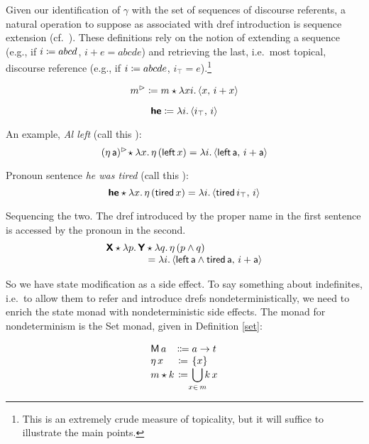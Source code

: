 	Given our identification of $\gamma$ with the set of sequences of discourse referents, a natural operation to suppose as associated with dref introduction is sequence extension (cf.~\citealt{Groote:2006, Unger:2012, Charlow:diss}). These definitions rely on the notion of extending a sequence (e.g., if $i \coloneqq abcd$, $i+e = abcde$) and retrieving the last, i.e.~most topical, discourse reference (e.g., if $i \coloneqq abcde$, $i_\top = e$).\footnote{This is an extremely crude measure of topicality, but it will suffice to illustrate the main points.}%
	\begin{defi}
		\[m^\rhd \coloneqq m \star \lambda xi.\,\langle x,\,i + x \rangle\]
	\end{defi}
	\begin{defi}
		\[\textbf{\textsf{he}} \coloneqq \lambda i.\,\langle i_\top,\,i \rangle\]
	\end{defi}
	
	An example, \emph{Al left} (call this ):
	\[(\eta\,\textsf{a})^\rhd\! \star \lambda x.\,\eta\,(\textsf{left}\,x) = \lambda i.\,\langle \textsf{left}\,\textsf{a},\,i+\textsf{a} \rangle\]%
	
	Pronoun sentence \emph{he was tired} (call this ):
	\[\textbf{\textsf{he}} \star \lambda x.\,\eta\,(\textsf{tired}\,x) = \lambda i.\,\langle \textsf{tired}\,i_\top,\,i \rangle\]%
	
	Sequencing the two. The dref introduced by the proper name in the first sentence is accessed by the pronoun in the second. %
	\[\begin{array}{r@{}l}
		\bsf{X} \star \lambda p.\,\bsf{Y}&{}\star \lambda q.\,\eta\,(p \wedge q) %
		\\
		&{}= \lambda i.\,\ab{\textsf{left}\,\textsf{a} \wedge \textsf{tired}\,\textsf{a},\,i+\textsf{a}}%
	\end{array}\]
	
	So we have state modification as a side effect. To say something about indefinites, i.e.~to allow them to refer and introduce drefs nondeterministically, we need to enrich the state monad with nondeterministic side effects. The monad for nondeterminism is the Set monad, given in Definition \ref{set}:%
	\begin{defi}\label{set}
		\[\begin{array}[t]
			{@{}l@{}c@{}l@{}}
			\textsf{M}\,a &{}\Coloneqq{} &a \ra t%
			\\
			\eta\,x &{}\ceq{} &\{x\}
			\\
			m \star k &{}\ceq{} &\displaystyle\bigcup_{\mathclap{x\in \,m}}k\,x%
		\end{array}\]
	\end{defi}

